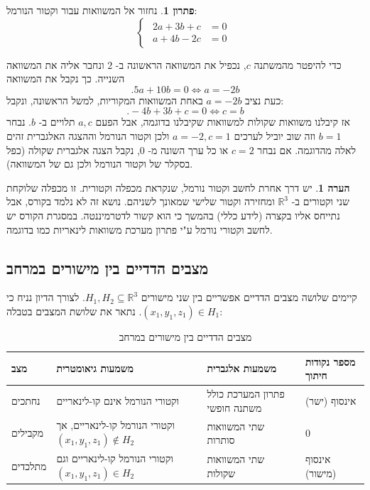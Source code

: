 \documentclass[12pt]{report}
\theoremstyle{plain}
\theoremstyle{definition}
\newtheorem{remark}{הערה}[chapter]
\newtheorem*{solution}{פתרון}
\newcommand{\R}{\mathbb{R}}
\newcommand{\0}{\mathbf{0}}
\begin{document}
\begin{solution}
נחזור אל המשוואות עבור וקטור הנורמל:
$$
\begin{cases}
\begin{aligned}
2a+3b+c&=0\\
a+4b-2c&=0
\end{aligned}
\end{cases}
$$

כדי להיפטר מהמשתנה 
$c$,
נכפיל את המשוואה הראשונה ב-
$2$
ונחבר אליה את המשוואה השנייה. כך נקבל את המשוואה
$$.5a+10b=0\iff a=-2b$$
כעת נציב 
$a=-2b$
באחת המשוואות המקוריות, למשל הראשונה, ונקבל:
$$
.-4b+3b+c=0\iff c=b
$$
אז קיבלנו משוואות שקולות למשוואות שקיבלנו בדוגמה, אבל הפעם 
$a,c$
תלויים ב-
$b$.
נבחר 
$b=1$
וזה שוב יוביל לערכים
$a=-2, c=1$
ולכן וקטור הנורמל וההצגה האלגברית זהים לאלה מהדוגמה. אם נבחר
$c=2$
או כל ערך השונה מ-
$0$,
נקבל הצגה אלגברית שקולה (כפל בסקלר של וקטור הנורמל ולכן גם של המשוואה).
\end{solution}

\begin{remark}
יש דרך אחרת לחשב וקטור נורמל, שנקראת מכפלה וקטורית. זו מכפלה שלוקחת שני וקטורים ב-
$\R^3$
ומחזירה וקטור שלישי שמאונך לשניהם. נושא זה לא נלמד בקורס, אבל נתייחס אליו בקצרה (לידע כללי) בהמשך כי הוא קשור לדטרמיננטה. במסגרת הקורס יש לחשב וקטורי נורמל ע"י פתרון מערכת משוואות לינאריות כמו בדוגמה.
\end{remark}

\subsection{מצבים הדדיים בין מישורים במרחב}
קיימים שלושה מצבים הדדיים אפשריים בין שני מישורים 
$H_1,H_2\subseteq\R^3$.
לצורך הדיון נניח כי 
$(x_1,y_1,z_1)\in H_1$.
נתאר את שלושת המצבים בטבלה:

\begin{table}[H]
\centering
\caption{\texthebrew{מצבים הדדיים בין מישורים במרחב}}
\begin{tabular}{|>{\raggedleft\arraybackslash}p{2.5cm}|>{\raggedleft\arraybackslash}p{3cm}|>{\raggedleft\arraybackslash}p{3cm}|>{\raggedleft\arraybackslash}p{2.5cm}|}
\hline
\texthebrew{\textbf{מצב}} & \texthebrew{\textbf{משמעות גיאומטרית}} & \texthebrew{\textbf{משמעות אלגברית}} & \texthebrew{\textbf{מספר נקודות חיתוך}} \\ \hline
\texthebrew{נחתכים} & \texthebrew{וקטורי הנורמל אינם קו-לינאריים} & \texthebrew{פתרון המערכת כולל משתנה חופשי} & \texthebrew{אינסוף (ישר)} \\ \hline
\texthebrew{מקבילים} & \texthebrew{וקטורי הנורמל קו-לינאריים, אך \newline \((x_1, y_1, z_1) \notin H_2\)} & \texthebrew{שתי המשוואות סותרות} & \texthebrew{0} \\ \hline
\texthebrew{מתלכדים} & \texthebrew{וקטורי הנורמל קו-לינאריים וגם \((x_1, y_1, z_1) \in H_2\)} & \texthebrew{שתי המשוואות שקולות} & \texthebrew{אינסוף (מישור)} \\ \hline
\end{tabular}
\end{table}
\end{document}
